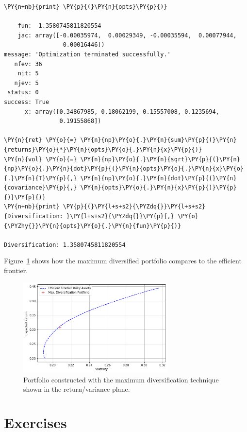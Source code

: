 \begin{codebox}
\begin{Verbatim}[commandchars=\\\{\}]
\PY{n+nb}{print} \PY{p}{(}\PY{n}{opts}\PY{p}{)}

    fun: -1.3580745811820554
    jac: array([-0.00035974,  0.00029349, -0.00035594,  0.00077944,  
                 0.00016446])
message: 'Optimization terminated successfully.'
   nfev: 36
    nit: 5
   njev: 5
 status: 0
success: True
      x: array([0.34867985, 0.18062199, 0.15557008, 0.1235694, 
                0.19155868])

\PY{n}{ret} \PY{o}{=} \PY{n}{np}\PY{o}{.}\PY{n}{sum}\PY{p}{(}\PY{n}{returns}\PY{o}{*}\PY{n}{opts}\PY{o}{.}\PY{n}{x}\PY{p}{)}
\PY{n}{vol} \PY{o}{=} \PY{n}{np}\PY{o}{.}\PY{n}{sqrt}\PY{p}{(}\PY{n}{np}\PY{o}{.}\PY{n}{dot}\PY{p}{(}\PY{n}{opts}\PY{o}{.}\PY{n}{x}\PY{o}{.}\PY{n}{T}\PY{p}{,} \PY{n}{np}\PY{o}{.}\PY{n}{dot}\PY{p}{(}\PY{n}{covariance}\PY{p}{,} \PY{n}{opts}\PY{o}{.}\PY{n}{x}\PY{p}{)}\PY{p}{)}\PY{p}{)} 
\PY{n+nb}{print} \PY{p}{(}\PY{l+s+s2}{\PYZdq{}}\PY{l+s+s2}{Diversification: }\PY{l+s+s2}{\PYZdq{}}\PY{p}{,} \PY{o}{\PYZhy{}}\PY{n}{opts}\PY{o}{.}\PY{n}{fun}\PY{p}{)}

Diversification: 1.3580745811820554
\end{Verbatim}
\end{codebox}

Figure~\ref{fig:max_div} shows how the maximum diversified portfolio compares to the efficient frontier.

\begin{figure}[htb]
	\centering
	\includegraphics[width=0.7\textwidth]{figures/max_div.png}
	\caption{Portfolio constructed with the maximum diversification technique shown in the return/variance plane.}
	\label{fig:max_div}
\end{figure}

\section{Exercises}


